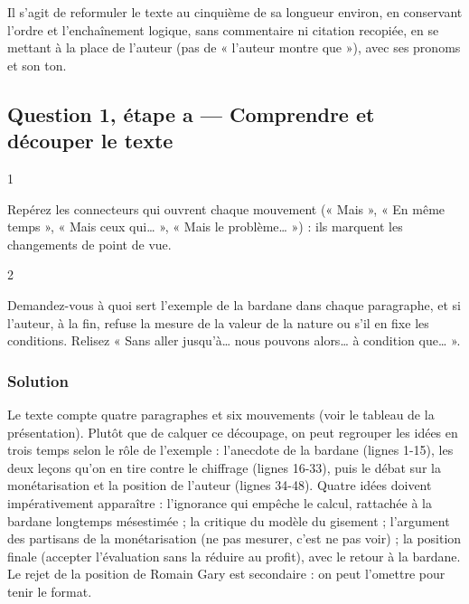 \documentclass[11pt,a4paper]{article}
\begin{document}
Il s'agit de reformuler le texte au cinquième de sa longueur environ, en conservant l'ordre et l'enchaînement logique, sans commentaire ni citation recopiée, en se mettant à la place de l'auteur (pas de « l'auteur montre que »), avec ses pronoms et son ton.

\hypertarget{question-1-uxe9tape-a-comprendre-et-duxe9couper-le-texte}{%
\subsection{Question 1, étape a --- Comprendre et découper le texte}\label{question-1-uxe9tape-a-comprendre-et-duxe9couper-le-texte}}

\begin{indication}{1}

Repérez les connecteurs qui ouvrent chaque mouvement (« Mais », « En même temps », « Mais ceux qui\ldots{} », « Mais le problème\ldots{} ») : ils marquent les changements de point de vue.

\end{indication}

\begin{indication}{2}

Demandez-vous à quoi sert l'exemple de la bardane dans chaque paragraphe, et si l'auteur, à la fin, refuse la mesure de la valeur de la nature ou s'il en fixe les conditions. Relisez « Sans aller jusqu'à\ldots{} nous pouvons alors\ldots{} à condition que\ldots{} ».

\end{indication}

\hypertarget{solution}{%
\subsubsection{Solution}\label{solution}}

Le texte compte quatre paragraphes et six mouvements (voir le tableau de la présentation). Plutôt que de calquer ce découpage, on peut regrouper les idées en trois temps selon le rôle de l'exemple : l'anecdote de la bardane (lignes 1-15), les deux leçons qu'on en tire contre le chiffrage (lignes 16-33), puis le débat sur la monétarisation et la position de l'auteur (lignes 34-48). Quatre idées doivent impérativement apparaître : l'ignorance qui empêche le calcul, rattachée à la bardane longtemps mésestimée ; la critique du modèle du gisement ; l'argument des partisans de la monétarisation (ne pas mesurer, c'est ne pas voir) ; la position finale (accepter l'évaluation sans la réduire au profit), avec le retour à la bardane. Le rejet de la position de Romain Gary est secondaire : on peut l'omettre pour tenir le format.
\end{document}
